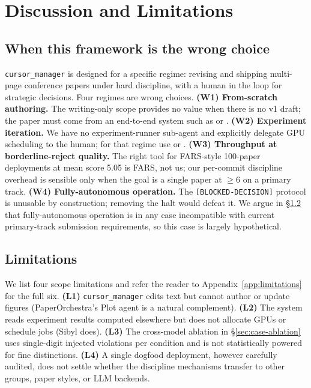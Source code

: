 \section{Discussion and Limitations}
\label{sec:discussion}

\subsection{When this framework is the wrong choice}
\label{sec:discussion-wrong-choice}

\texttt{cursor\_manager} is designed for a specific regime: revising
and shipping multi-page conference papers under hard discipline, with
a human in the loop for strategic decisions. Four regimes are wrong
choices. \textbf{(W1) From-scratch authoring.} The writing-only scope
provides no value when there is no v1 draft; the paper must come from
an end-to-end system such as \citet{song2026paperorchestra} or
\citet{sibyl2026system}. \textbf{(W2) Experiment iteration.} We have
no experiment-runner sub-agent and explicitly delegate GPU scheduling
to the human; for that regime use \citet{sibyl2026system} or
\citet{karpathy2026autoresearch}. \textbf{(W3) Throughput at
borderline-reject quality.} The right tool for FARS-style 100-paper
deployments at mean score 5.05 \citep{fars2026analemma} is FARS, not
us; our per-commit discipline overhead is sensible only when the goal
is a single paper at $\geq 6$ on a primary track. \textbf{(W4)
Fully-autonomous operation.} The \texttt{[BLOCKED-DECISION]} protocol
is unusable by construction; removing the halt would defeat it. We
argue in \S\ref{sec:limitations} that fully-autonomous operation is
in any case incompatible with current primary-track submission
requirements, so this case is largely hypothetical.

\subsection{Limitations}
\label{sec:limitations}

We list four scope limitations and refer the reader to
Appendix~\ref{app:limitations} for the full six. \textbf{(L1)}
\texttt{cursor\_manager} edits text but cannot author or update
figures (PaperOrchestra's Plot agent \citep{song2026paperorchestra}
is a natural complement). \textbf{(L2)} The system reads experiment
results computed elsewhere but does not allocate GPUs or schedule
jobs (Sibyl \citep{sibyl2026system} does). \textbf{(L3)} The
cross-model ablation in \S\ref{sec:case-ablation} uses single-digit
injected violations per condition and is not statistically powered
for fine distinctions. \textbf{(L4)} A single dogfood deployment,
however carefully audited, does not settle whether the discipline
mechanisms transfer to other groups, paper styles, or LLM backends.

